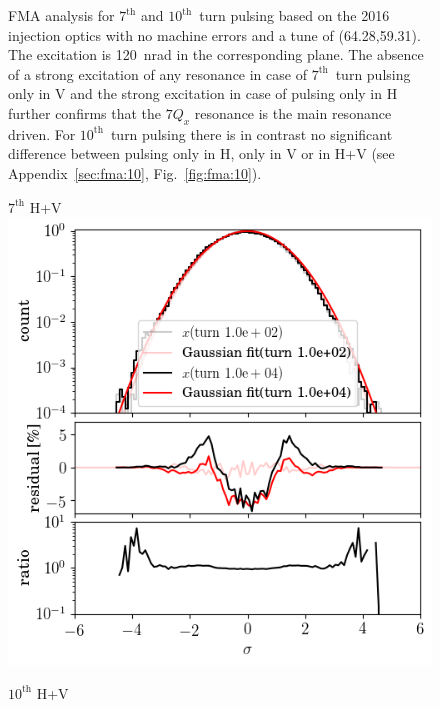 \documentclass[%
 reprint,
 amsmath,amssymb,
 aps,
prstab,
]{revtex4-1}
\begin{document}
\begin{figure}[h]
\begin{minipage}[t]{0.49\linewidth}
	\end{minipage}
	\caption{\label{fig:patternfma} FMA analysis for $7^{\mathrm{th}}$ and $10^{\mathrm{th}}$~turn pulsing based on the 2016 injection optics with no machine errors and a tune of (64.28,59.31). The excitation is 120~nrad in the corresponding plane. The absence of a strong excitation of any resonance in case of $7^{\mathrm{th}}$~turn pulsing only in V and the strong excitation in case of pulsing only in H further confirms that the $7Q_x$ resonance is the main resonance driven. For $10^{\mathrm{th}}$~turn pulsing there is in contrast no significant difference between pulsing only in H, only in V or in H+V (see Appendix~\ref{sec:fma:10}, Fig.~\ref{fig:fma:10}).}
\end{figure}  


\begin{figure}[t]
	\begin{minipage}[t]{0.49\linewidth}
		\centering
		$7^{\mathrm{th}}$ H+V
		\includegraphics[width=1.0\linewidth]{2016injerra2b2u_t7skhv_3_5um_hist_x.png}
	\end{minipage}
	\begin{minipage}[t]{0.49\linewidth}
		\centering
		$10^{\mathrm{th}}$ H+V

\end{minipage}
\end{figure}
\end{document}

